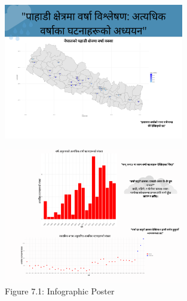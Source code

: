 \begin{figure}[h]
\centering
\includegraphics[width=0.7\textwidth]{figures/info1.png}
\end{figure}

\begin{figure}[h]
\centering
\includegraphics[width=0.7\textwidth]{figures/info2.png}
\caption{Figure 7.1: Infographic Poster}
\end{figure}

\clearpage